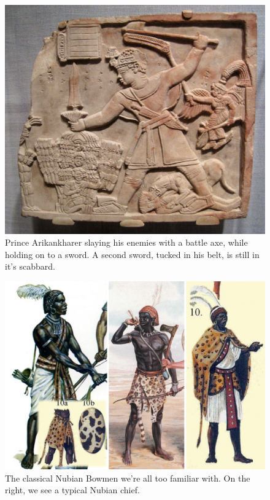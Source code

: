 \documentclass[a4paper,12pt]{scrreprt}
\begin{document}
\begin{figure}[H]
	\centering
	\includegraphics[width=\textwidth]{img/heros/prince_arikankharer_slays_enemies}
	\caption{Prince Arikankharer slaying his enemies with a battle axe, while holding on to a sword. A second sword, tucked in his belt, is still in it's scabbard.}
\end{figure}

\begin{figure}[H]
	\centering
	\includegraphics[width=\textwidth]{img/nubien_bowmen/nubien_bowmen}
	\caption{The classical Nubian Bowmen we're all too familiar with. On the right, we see a typical Nubian chief.}
\end{figure}
\end{document}
